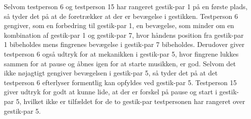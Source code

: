 Selvom testperson 6 og testperson 15 har rangeret gestik-par 1 på en første plads, så tyder det på at de foretrækker at der er bevægelse i gestikken. Testperson 6 gengiver, som en forbedring til gestik-par 1, en bevægelse, som minder om en kombination af gestik-par 1 og gestik-par 7, hvor håndens position fra gestik-par 1 bibeholdes mens fingrenes bevægelse i gestik-par 7 bibeholdes. Derudover giver testperson 6 også udtryk for at mekanikken i gestik-par 5, hvor fingrene lukkes sammen for at pause og åbnes igen for at starte musikken, er god. Selvom det ikke nøjagtigt gengiver bevægelsen i gestik-par 5, så tyder det på at det testperson 6 efterlyser formentlig kan opfyldes ved gestik-par 5. Testperson 15 giver udtryk for godt at kunne lide, at der er forskel på pause og start i gestik-par 5, hvilket ikke er tilfældet for de to gestik-par testpersonen har rangeret over gestik-par 5. 

